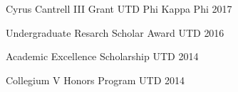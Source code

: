 \begin{cvhonors}

\cvhonor
{Cyrus Cantrell III Grant} %
{UTD Phi Kappa Phi} %
{} %
{2017} %


\cvhonor
{Undergraduate Resarch Scholar Award} %
{UTD} %
{} %
{2016} %


\cvhonor
{Academic Excellence Scholarship} %
{UTD} %
{} %
{2014} %


\cvhonor
{Collegium V Honors Program} %
{UTD} %
{} %
{2014} %

\end{cvhonors}


